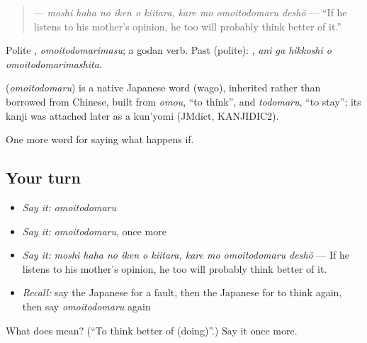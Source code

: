 \begin{quote}
\textbf{    } — \emph{moshi haha no iken o kiitara, kare mo omoitodomaru deshō} — \textquotedblleft{}If he listens to his mother's opinion, he too will probably think better of it.\textquotedblright{}
\end{quote}

Polite \textbf{}, \emph{omoitodomarimasu}; a godan verb. Past (polite): \textbf{  }, \emph{ani ga hikkoshi o omoitodomarimashita}.

\begin{cousinweb}
\textbf{} (\emph{omoitodomaru}) is a native Japanese word (wago), inherited rather than borrowed from Chinese, built from \emph{omou}, \textquotedblleft{}to think\textquotedblright{}, and \emph{todomaru}, \textquotedblleft{}to stay\textquotedblright{}; its kanji was attached later as a kun'yomi (JMdict, KANJIDIC2).
\end{cousinweb}

\begin{grammarlens}[title={What you've built}]
One more word for saying what happens if.
\end{grammarlens}

\subsection*{Your turn}
\begin{itemize}
\raggedright
  \item \emph{Say it:} \emph{omoitodomaru}
  \item \emph{Say it:} \emph{omoitodomaru}, once more
  \item \emph{Say it:} \emph{moshi haha no iken o kiitara, kare mo omoitodomaru deshō} — If he listens to his mother's opinion, he too will probably think better of it.
  \item \emph{Recall:} say the Japanese for a fault, then the Japanese for to think again, then say \emph{omoitodomaru} again
\end{itemize}

\begin{tcolorbox}[breakable,colback=teal!4,colframe=teal!35!black,title={Before you move on}]
What does  mean? (\textquotedblleft{}To think better of (doing)\textquotedblright{}.) Say it once more.
\end{tcolorbox}
